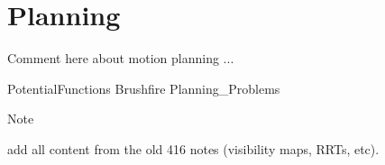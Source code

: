 \hypertarget{Chap:Planning}{%
\section{Planning}\label{Chap:Planning}}

Comment here about motion planning ...

PotentialFunctions Brushfire Planning\_Problems

Note

add all content from the old 416 notes (visibility maps, RRTs, etc).
